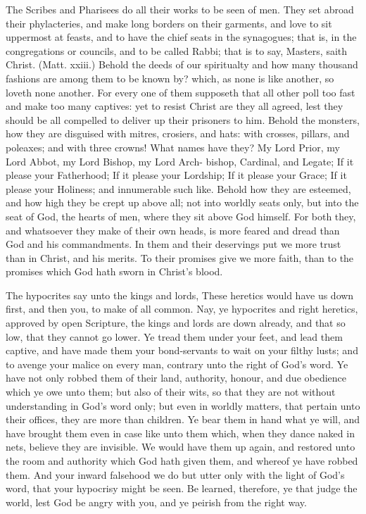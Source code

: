 The Scribes and Pharisees do all their works to be 
seen of men. They set abroad their phylacteries, and 
make long borders on their garments, and love to sit 
uppermost at feasts, and to have the chief seats in the 
synagogues; that is, in the congregations or councils, 
and to be called Rabbi; that is to say, Masters, saith 
Christ. (Matt. xxiii.) Behold the deeds of our spiritualty
and how many thousand fashions are among them 
to be known by? which, as none is like another, so loveth 
none another. For every one of them supposeth that all 
other poll too fast and make too many captives: yet to resist
Christ are they all agreed, lest they should be all compelled
to deliver up their prisoners to him. Behold the 
monsters, how they are disguised with mitres, crosiers, 
and hats: with crosses, pillars, and poleaxes; and with 
three crowns! What names have they? My Lord 
Prior, my Lord Abbot, my Lord Bishop, my Lord Arch- 
bishop, Cardinal, and Legate; If it please your Fatherhood;
If it please your Lordship; If it please your 
Grace; If it please your Holiness; and innumerable 
such like. Behold how they are esteemed, and how high 
they be crept up above all; not into worldly seats only, but 
into the seat of God, the hearts of men, where they sit 
above God himself. For both they, and whatsoever they 
make of their own heads, is more feared and dread than 
God and his commandments. In them and their deservings
put we more trust than in Christ, and his merits. To 
their promises give we more faith, than to the promises 
which God hath sworn in Christ's blood. 

The hypocrites say unto the kings and lords, These 
heretics would have us down first, and then you, to make 
of all common. Nay, ye hypocrites and right heretics, 
approved by open Scripture, the kings and lords are down 
already, and that so low, that they cannot go lower. Ye 
tread them under your feet, and lead them captive, and 
have made them your bond-servants to wait on your 
filthy lusts; and to avenge your malice on every man, 
contrary unto the right of God's word. Ye have not only 
robbed them of their land, authority, honour, and due 
obedience which ye owe unto them; but also of their 
wits, so that they are not without understanding in God's 
word only; but even in worldly matters, that pertain unto 
their offices, they are more than children. Ye bear them 
in hand what ye will, and have brought them even in case 
like unto them which, when they dance naked in nets, believe
they are invisible. We would have them up again, 
and restored unto the room and authority which God hath 
given them, and whereof ye have robbed them. And your 
inward falsehood we do but utter only with the light of 
God's word, that your hypocrisy might be seen. Be 
learned, therefore, ye that judge the world, lest God be 
angry with you, and ye peirish from the right way. 

